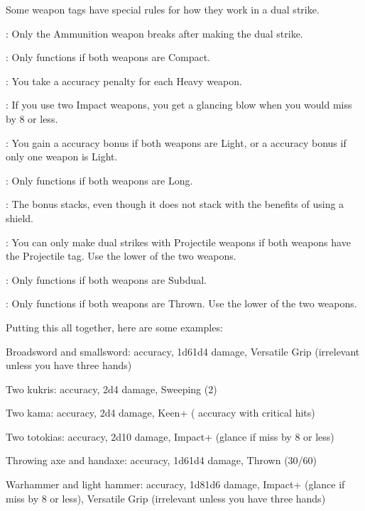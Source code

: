     Some weapon tags have special rules for how they work in a dual strike.
    \begin{raggeditemize}
      \item {}: Only the Ammunition weapon breaks after making the dual strike.
      \item {}: Only functions if both weapons are Compact.
      \item {}: You take a  accuracy penalty for each Heavy weapon.
      \item {}: If you use two Impact weapons, you get a glancing blow when you would miss by 8 or less.
      \item {}: You gain a  accuracy bonus if both weapons are Light, or a  accuracy bonus if only one weapon is Light.
      \item {}: Only functions if both weapons are Long.
      \item {}: The bonus stacks, even though it does not stack with the benefits of using a shield.
      \item {}: You can only make dual strikes with Projectile weapons if both weapons have the Projectile tag. Use the lower  of the two weapons.
      \item {}: Only functions if both weapons are Subdual.
      \item {}: Only functions if both weapons are Thrown. Use the lower  of the two weapons.
    \end{raggeditemize}

    Putting this all together, here are some examples:
    \begin{raggeditemize}
      \item Broadsword and smallsword:  accuracy, 1d6\plus1d4 damage, Versatile Grip (irrelevant unless you have three hands)
      \item Two kukris:  accuracy, 2d4 damage, Sweeping (2)
      \item Two kama:  accuracy, 2d4 damage, Keen+ ( accuracy with critical hits)
      \item Two totokias:  accuracy, 2d10 damage, Impact+ (glance if miss by 8 or less)
      \item Throwing axe and handaxe:  accuracy, 1d6\plus1d4 damage, Thrown (30/60)
      \item Warhammer and light hammer:  accuracy, 1d8\plus1d6 damage, Impact+ (glance if miss by 8 or less), Versatile Grip (irrelevant unless you have three hands)
    \end{raggeditemize}

